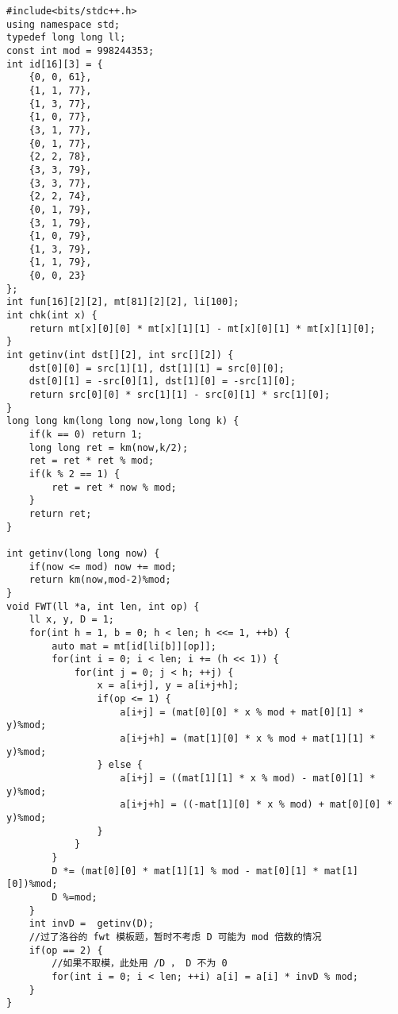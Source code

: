 \documentclass[UTF8]{ctexart}
\begin{document}
\begin{framed}
\begin{lstlisting}
#include<bits/stdc++.h>
using namespace std;
typedef long long ll;
const int mod = 998244353;
int id[16][3] = {
    {0, 0, 61},
    {1, 1, 77},
    {1, 3, 77},
    {1, 0, 77},
    {3, 1, 77},
    {0, 1, 77},
    {2, 2, 78},
    {3, 3, 79},
    {3, 3, 77},
    {2, 2, 74},
    {0, 1, 79},
    {3, 1, 79},
    {1, 0, 79},
    {1, 3, 79},
    {1, 1, 79},
    {0, 0, 23}
};
int fun[16][2][2], mt[81][2][2], li[100];
int chk(int x) {
    return mt[x][0][0] * mt[x][1][1] - mt[x][0][1] * mt[x][1][0];   
}
int getinv(int dst[][2], int src[][2]) {
    dst[0][0] = src[1][1], dst[1][1] = src[0][0];
    dst[0][1] = -src[0][1], dst[1][0] = -src[1][0];
    return src[0][0] * src[1][1] - src[0][1] * src[1][0];
}
long long km(long long now,long long k) {
	if(k == 0) return 1;
	long long ret = km(now,k/2);
	ret = ret * ret % mod;
	if(k % 2 == 1) {
		ret = ret * now % mod;
	}
	return ret;
}

int getinv(long long now) {
	if(now <= mod) now += mod;
	return km(now,mod-2)%mod;
}
void FWT(ll *a, int len, int op) {
    ll x, y, D = 1;
    for(int h = 1, b = 0; h < len; h <<= 1, ++b) {
        auto mat = mt[id[li[b]][op]];
        for(int i = 0; i < len; i += (h << 1)) {
            for(int j = 0; j < h; ++j) {
                x = a[i+j], y = a[i+j+h];
                if(op <= 1) {
                    a[i+j] = (mat[0][0] * x % mod + mat[0][1] * y)%mod;
                    a[i+j+h] = (mat[1][0] * x % mod + mat[1][1] * y)%mod;
                } else {
                    a[i+j] = ((mat[1][1] * x % mod) - mat[0][1] * y)%mod;
                    a[i+j+h] = ((-mat[1][0] * x % mod) + mat[0][0] * y)%mod;
                }
            }
        }
        D *= (mat[0][0] * mat[1][1] % mod - mat[0][1] * mat[1][0])%mod;
        D %=mod;
    }
    int invD =  getinv(D);
    //过了洛谷的 fwt 模板题，暂时不考虑 D 可能为 mod 倍数的情况 
    if(op == 2) {
    	//如果不取模，此处用 /D ， D 不为 0 
        for(int i = 0; i < len; ++i) a[i] = a[i] * invD % mod;
    }
}


\end{lstlisting}
\end{framed}
\end{document}
